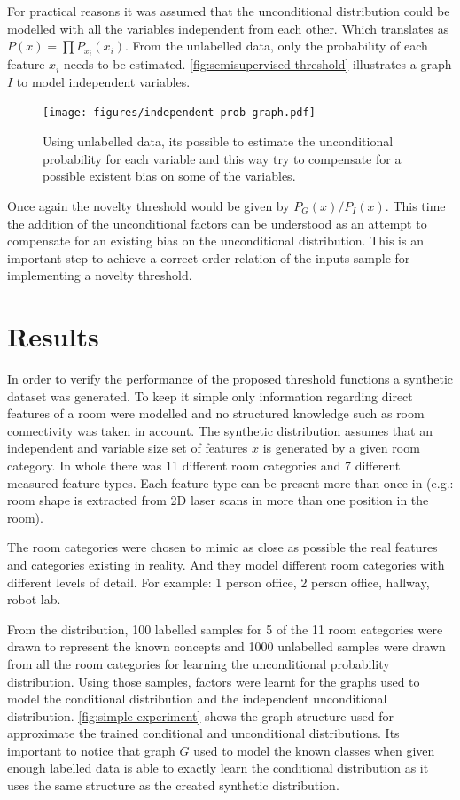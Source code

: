 \documentclass[runningheads,a4paper]{llncs}
\begin{document}
For practical reasons it was assumed that the unconditional distribution
could be modelled with all the variables independent from each other.
Which translates as $P(x)=\prod{P_{x_i}(x_i)}$.
From the unlabelled data, only the probability of each feature $x_i$ needs to be estimated.
\autoref{fig:semisupervised-threshold} illustrates a graph $I$ to model independent variables.

\begin{figure}[h]
\centering
\texttt{[image: figures/independent-prob-graph.pdf]}
\caption{\label{fig:semisupervised-threshold}Using unlabelled data, its possible to estimate
         the unconditional probability for each variable and this way try to compensate
         for a possible existent bias on some of the variables.}
\end{figure}

Once again the novelty threshold would be given by $P_G(x)/P_I(x)$.
This time the addition of the unconditional factors can be understood as an
attempt to compensate for an existing bias on the unconditional distribution.
This is an important step to achieve a correct order-relation of the inputs sample
for implementing a novelty threshold.


\section{Results}
In order to verify the performance of the proposed threshold functions a synthetic dataset
was generated. To keep it simple only information regarding direct features of
a room were modelled and no structured knowledge such as room connectivity was taken
in account.
The synthetic distribution assumes that an independent and variable size set of features
$x$ is generated by a given room category.
In whole there was 11 different room categories and 7 different measured feature
types. Each feature type can be present more than once in (e.g.: room shape is
extracted from 2D laser scans in more than one position in the room).

The room categories were chosen to mimic as close as possible the real features and
categories existing in reality. And they model different room categories with
different levels of detail. For example: 1 person office, 2 person office, hallway,
robot lab.

From the distribution, 100 labelled samples for 5 of the 11 room categories were
drawn to represent the known concepts and 1000 unlabelled samples were drawn from
all the room categories for learning the unconditional probability distribution.
Using those samples, factors were learnt for the graphs used to model the
conditional distribution and the independent unconditional distribution.
\autoref{fig:simple-experiment} shows the graph structure used for approximate the
trained conditional and unconditional distributions.
Its important to notice that graph $G$ used to model the known classes when given
enough labelled data is able to exactly learn the conditional distribution as it
uses the same structure as the created synthetic distribution.
\end{document}
